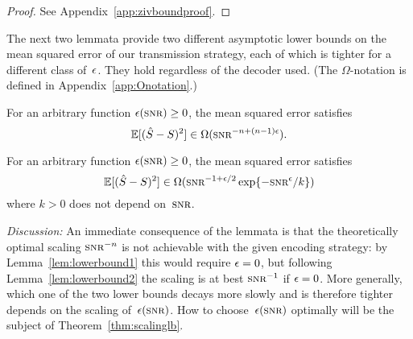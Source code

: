 \begin{proof}
  See Appendix~\ref{app:zivboundproof}.
\end{proof}

The next two lemmata provide two different asymptotic lower bounds on the
mean squared error of our transmission strategy, each of which is tighter for a
different class of~$\epsilon$. They hold regardless of the decoder used.  (The
$\Omega$-notation is defined in Appendix~\ref{app:Onotation}.)

\begin{lemma}
  \label{lem:lowerbound1}
  For an arbitrary function $\e(\snr) \ge 0$, the mean squared error satisfies
  \begin{equation*}
    \mse \in \Omega(\snr^{-n + (n-1)\e}).
  \end{equation*}
\end{lemma}

\begin{lemma}
  \label{lem:lowerbound2}
  For an arbitrary function $\e(\snr) \ge 0$, the mean squared error satisfies
  \begin{equation*}
    \mse \in \Omega(\snr^{-1+\e/2} \exp\{-\snr^\e/k\})
  \end{equation*}
  where $k > 0$ does not depend on~$\snr$.
\end{lemma}

\emph{Discussion:} An immediate consequence of the lemmata is that the
theoretically optimal scaling $\snr^{-n}$ is not achievable with the given
encoding strategy: by Lemma~\ref{lem:lowerbound1} this would require $\epsilon = 0$,
but following Lemma~\ref{lem:lowerbound2} the scaling is at best $\snr^{-1}$ if
$\epsilon = 0 $.  More generally, which one of the two lower bounds decays more slowly
and is therefore tighter depends on the scaling of~$\e(\snr)$. How to
choose~$\e(\snr)$ optimally will be the subject of Theorem~\ref{thm:scalinglb}.

